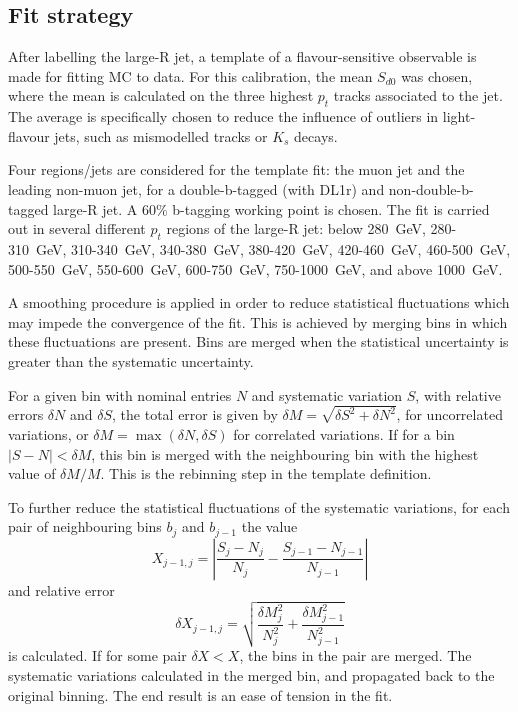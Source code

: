 \documentclass[10pt,a4paper]{book}
\begin{document}
\subsection{Fit strategy}

After labelling the large-R jet, a template of a flavour-sensitive observable is made for fitting MC to data. For this calibration, the mean $S_{d0}$ was chosen, where the mean is calculated on the three highest $p_t$ tracks associated to the jet. The average is specifically chosen to reduce the influence of outliers in light-flavour jets, such as mismodelled tracks or $K_s$ decays.

Four regions/jets are considered for the template fit: the muon jet and the leading non-muon jet, for a double-b-tagged (with DL1r) and non-double-b-tagged large-R jet. A 60\% b-tagging working point is chosen. The fit is carried out in several different $p_t$ regions of the large-R jet: below 280~GeV, 280-310~GeV, 310-340~GeV, 340-380~GeV, 380-420~GeV, 420-460~GeV, 460-500~GeV, 500-550~GeV, 550-600~GeV, 600-750~GeV, 750-1000~GeV, and above 1000~GeV.

A smoothing procedure is applied in order to reduce statistical fluctuations which may impede the convergence of the fit. This is achieved by merging bins in which these fluctuations are present. Bins are merged when the statistical uncertainty is greater than the systematic uncertainty. 

For a given bin with nominal entries $N$ and systematic variation $S$, with relative errors $\delta N$ and $\delta S$, the total error is given by $\delta M = \sqrt{\delta S^2 + \delta N^2}$, for uncorrelated variations, or $\delta M = \max(\delta N, \delta S)$ for correlated variations. If for a bin $\vert S  - N\vert < \delta M$, this bin is merged with the neighbouring bin with the highest value of $\delta M/M$. This is the rebinning step in the template definition.

To further reduce the statistical fluctuations of the systematic variations, for each pair of neighbouring bins $b_j$ and $b_{j-1}$ the value
\begin{equation}
    X_{j-1,j} = \left| \frac{S_j - N_j}{N_j} - \frac{S_{j-1} - N_{j-1}}{N_{j-1}} \right|
\end{equation}
and relative error
\begin{equation}
\delta X_{j-1,j} = \sqrt{\frac{\delta M_j^2}{N_j^2} + \frac{\delta M_{j-1}^2}{N_{j-1}^2}}
\end{equation}
is calculated. If for some pair $\delta X < X$, the bins in the pair are merged. The systematic variations calculated in the merged bin, and propagated back to the original binning. The end result is an ease of tension in the fit. 
\end{document}
